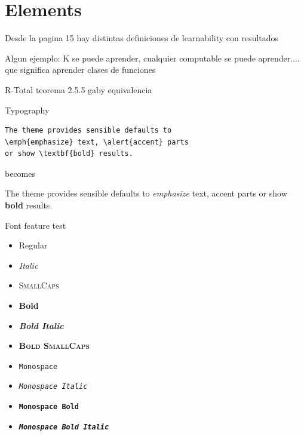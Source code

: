 \documentclass[10pt]{beamer}
\begin{document}
\section{Elements}

\begin{frame}

Desde la pagina 15 hay distintas definiciones de learnability con resultados

Algun ejemplo: K se puede aprender, cualquier computable se puede aprender....
que significa aprender clases de funciones

R-Total teorema 2.5.5 gaby equivalencia 

\end{frame}
























\begin{frame}[fragile]{Typography}
      \begin{verbatim}The theme provides sensible defaults to
\emph{emphasize} text, \alert{accent} parts
or show \textbf{bold} results.\end{verbatim}

  \begin{center}becomes\end{center}

  The theme provides sensible defaults to \emph{emphasize} text,
  \alert{accent} parts or show \textbf{bold} results.
\end{frame}

\begin{frame}{Font feature test}
  \begin{itemize}
    \item Regular
    \item \textit{Italic}
    \item \textsc{SmallCaps}
    \item \textbf{Bold}
    \item \textbf{\textit{Bold Italic}}
    \item \textbf{\textsc{Bold SmallCaps}}
    \item \texttt{Monospace}
    \item \texttt{\textit{Monospace Italic}}
    \item \texttt{\textbf{Monospace Bold}}
    \item \texttt{\textbf{\textit{Monospace Bold Italic}}}
  \end{itemize}
\end{frame}
\end{document}

